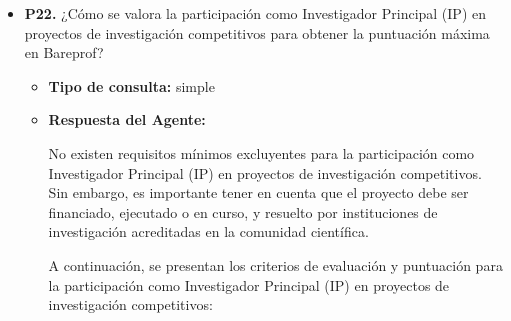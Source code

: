 \documentclass{article}
\begin{document}
\begin{itemize}
\begin{itemize}
            \end{itemize}

      \item \textbf{P22.} ¿Cómo se valora la participación como Investigador Principal (IP) en proyectos de investigación competitivos para obtener la puntuación máxima en Bareprof? \\
            \begin{itemize}
                  \item \textbf{Tipo de consulta:} simple
                  \item \textbf{Respuesta del Agente:}

                        No existen requisitos mínimos excluyentes para la participación como Investigador Principal (IP) en proyectos de investigación competitivos. Sin embargo, es importante tener en cuenta que el proyecto debe ser financiado, ejecutado o en curso, y resuelto por instituciones de investigación acreditadas en la comunidad científica.

                        A continuación, se presentan los criterios de evaluación y puntuación para la participación como Investigador Principal (IP) en proyectos de investigación competitivos:


\end{itemize}
\end{itemize}
\end{document}

